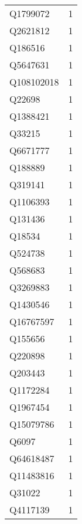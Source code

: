 \begin{tabular}{lr}
    Q1799072 &                             1 \\
    Q2621812 &                             1 \\
     Q186516 &                             1 \\
    Q5647631 &                             1 \\
  Q108102018 &                             1 \\
      Q22698 &                             1 \\
    Q1388421 &                             1 \\
      Q33215 &                             1 \\
    Q6671777 &                             1 \\
     Q188889 &                             1 \\
     Q319141 &                             1 \\
    Q1106393 &                             1 \\
     Q131436 &                             1 \\
      Q18534 &                             1 \\
     Q524738 &                             1 \\
     Q568683 &                             1 \\
    Q3269883 &                             1 \\
    Q1430546 &                             1 \\
   Q16767597 &                             1 \\
     Q155656 &                             1 \\
     Q220898 &                             1 \\
     Q203443 &                             1 \\
    Q1172284 &                             1 \\
    Q1967454 &                             1 \\
   Q15079786 &                             1 \\
       Q6097 &                             1 \\
   Q64618487 &                             1 \\
   Q11483816 &                             1 \\
      Q31022 &                             1 \\
    Q4117139 &                             1 \\

\end{tabular}
